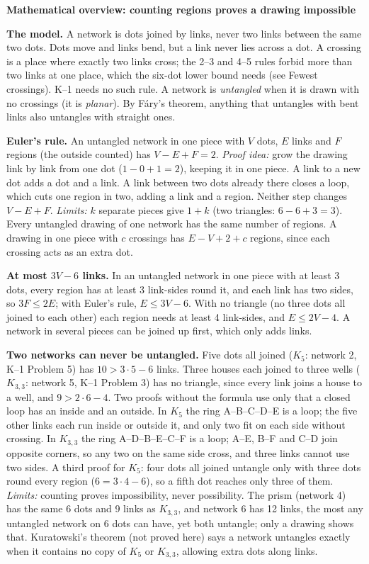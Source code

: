 \documentclass[11pt]{article}
\newcommand{\head}[1]{\par\needspace{5\baselineskip}\textbf{\large #1}\par\nopagebreak}
\begin{document}
\head{Mathematical overview: counting regions proves a drawing impossible}
\textbf{The model.} A network is dots joined by links, never two links between the same two dots. Dots move and links bend, but a link never lies across a dot. A crossing is a place where exactly two links cross; the 2--3 and 4--5 rules forbid more than two links at one place, which the six-dot lower bound needs (see Fewest crossings). K--1 needs no such rule. A network is \emph{untangled} when it is drawn with no crossings (it is \emph{planar}). By F\'ary's theorem, anything that untangles with bent links also untangles with straight ones.

\textbf{Euler's rule.} An untangled network in one piece with $V$ dots, $E$ links and $F$ regions (the outside counted) has $V-E+F=2$. \emph{Proof idea:} grow the drawing link by link from one dot ($1-0+1=2$), keeping it in one piece. A link to a new dot adds a dot and a link. A link between two dots already there closes a loop, which cuts one region in two, adding a link and a region. Neither step changes $V-E+F$. \emph{Limits:} $k$ separate pieces give $1+k$ (two triangles: $6-6+3=3$). Every untangled drawing of one network has the same number of regions. A drawing in one piece with $c$ crossings has $E-V+2+c$ regions, since each crossing acts as an extra dot.

\textbf{At most $3V-6$ links.} In an untangled network in one piece with at least 3 dots, every region has at least 3 link-sides round it, and each link has two sides, so $3F\le 2E$; with Euler's rule, $E\le 3V-6$. With no triangle (no three dots all joined to each other) each region needs at least 4 link-sides, and $E\le 2V-4$. A network in several pieces can be joined up first, which only adds links.

\textbf{Two networks can never be untangled.} Five dots all joined ($K_5$: network 2, K--1 Problem 5) has $10>3\cdot5-6$ links. Three houses each joined to three wells ($K_{3,3}$: network 5, K--1 Problem 3) has no triangle, since every link joins a house to a well, and $9>2\cdot6-4$. Two proofs without the formula use only that a closed loop has an inside and an outside. In $K_5$ the ring A--B--C--D--E is a loop; the five other links each run inside or outside it, and only two fit on each side without crossing. In $K_{3,3}$ the ring A--D--B--E--C--F is a loop; A--E, B--F and C--D join opposite corners, so any two on the same side cross, and three links cannot use two sides. A third proof for $K_5$: four dots all joined untangle only with three dots round every region ($6=3\cdot4-6$), so a fifth dot reaches only three of them. \emph{Limits:} counting proves impossibility, never possibility. The prism (network 4) has the same 6 dots and 9 links as $K_{3,3}$, and network 6 has 12 links, the most any untangled network on 6 dots can have, yet both untangle; only a drawing shows that. Kuratowski's theorem (not proved here) says a network untangles exactly when it contains no copy of $K_5$ or $K_{3,3}$, allowing extra dots along links.
\end{document}
